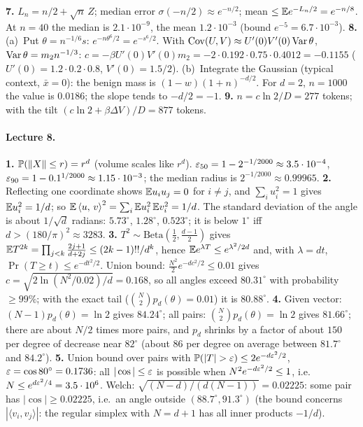 \textbf{7.} $L_n=n/2+\sqrt n\,Z$; median error $\sigma(-n/2)\approx e^{-n/2}$; mean $\le\mathbb{E} e^{-L_n/2}=e^{-n/8}$. At $n=40$ the median is $2.1\cdot10^{-9}$, the mean $1.2\cdot10^{-3}$ (bound $e^{-5}=6.7\cdot10^{-3}$). \quad
\textbf{8.} (a)~Put $\theta=n^{-1/6}s$: $e^{-n\theta^6/2}=e^{-s^6/2}$. With $\operatorname{Cov}(U,V)\approx U'(0)V'(0)\operatorname{Var}\theta$, $\operatorname{Var}\theta=m_2n^{-1/3}$: $c=-\beta U'(0)V'(0)m_2=-2\cdot0.192\cdot0.75\cdot0.4012=-0.1155$ ($U'(0)=1.2\cdot0.2\cdot0.8$, $V'(0)=1.5/2$). (b)~Integrate the Gaussian (typical context, $\bar x=0$): the benign mass is $(1-w)(1+n)^{-d/2}$. For $d=2$, $n=1000$ the value is $0.0186$; the slope tends to $-d/2=-1$. \quad
\textbf{9.} $n=c\ln2/D=277$ tokens; with the tilt $(c\ln2+\beta\Delta V)/D=877$ tokens.

\paragraph{Lecture 8.}
\textbf{1.} $\mathbb{P}(\left\lVert X\right\rVert\le r)=r^d$ (volume scales like $r^d$). $\varepsilon_{50}=1-2^{-1/2000}\approx3.5\cdot10^{-4}$, $\varepsilon_{90}=1-0.1^{1/2000}\approx1.15\cdot10^{-3}$; the median radius is $2^{-1/2000}\approx0.99965$. \quad
\textbf{2.} Reflecting one coordinate shows $\mathbb{E} u_iu_j=0$ for $i\ne j$, and $\sum_iu_i^2=1$ gives $\mathbb{E} u_i^2=1/d$; so $\mathbb{E}\left\langle u,\,v\right\rangle^2=\sum_i\mathbb{E} u_i^2\,\mathbb{E} v_i^2=1/d$. The standard deviation of the angle is about $1/\sqrt d$ radians: $5.73^\circ$, $1.28^\circ$, $0.523^\circ$; it is below $1^\circ$ iff $d>(180/\pi)^2\approx3283$. \quad
\textbf{3.} $T^2\sim\mathrm{Beta}(\frac12,\frac{d-1}2)$ gives $\mathbb{E} T^{2k}=\prod_{j<k}\frac{2j+1}{d+2j}\le(2k-1)!!/d^k$, hence $\mathbb{E} e^{\lambda T}\le e^{\lambda^2/2d}$ and, with $\lambda=dt$, $\Pr(T\ge t)\le e^{-dt^2/2}$. Union bound: $\frac{N^2}2e^{-dc^2/2}\le0.01$ gives $c=\sqrt{2\ln(N^2/0.02)/d}=0.168$, so all angles exceed $80.31^\circ$ with probability $\ge99\%$; with the exact tail ($\binom N2p_d(\theta)=0.01$) it is $80.88^\circ$. \quad
\textbf{4.} Given vector: $(N-1)p_d(\theta)=\ln2$ gives $84.24^\circ$; all pairs: $\binom N2p_d(\theta)=\ln2$ gives $81.66^\circ$; there are about $N/2$ times more pairs, and $p_d$ shrinks by a factor of about $150$ per degree of decrease near $82^\circ$ (about $86$ per degree on average between $81.7^\circ$ and $84.2^\circ$). \quad
\textbf{5.} Union bound over pairs with $\Pr(|T|>\eps)\le2e^{-d\eps^2/2}$, $\varepsilon=\cos80^\circ=0.1736$: all $|\cos|\le\varepsilon$ is possible when $N^2e^{-d\varepsilon^2/2}\le1$, i.e.\ $N\le e^{d\varepsilon^2/4}=3.5\cdot10^6$. Welch: $\sqrt{(N-d)/(d(N-1))}=0.02225$: some pair has $|\cos|\ge0.02225$, i.e.\ an angle outside $(88.7^\circ,91.3^\circ)$ (the bound concerns $|\langle v_i,v_j\rangle|$: the regular simplex with $N=d+1$ has all inner products $-1/d$). \quad
